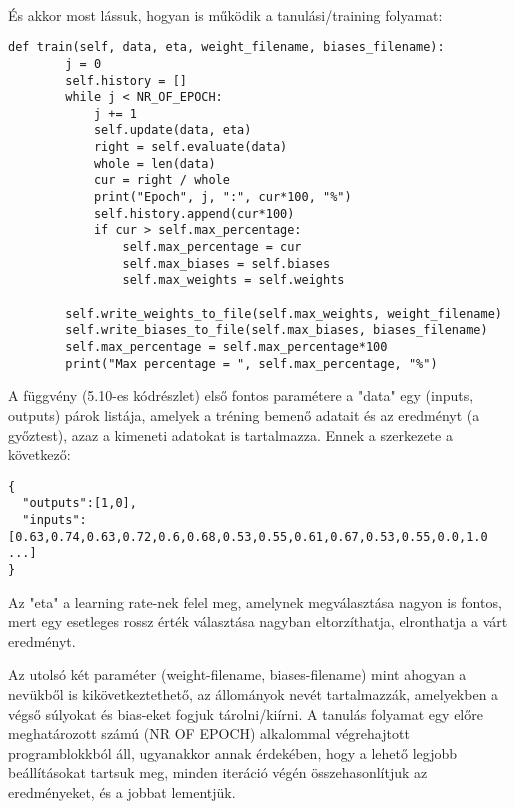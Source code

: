 \paragraph{}
És akkor most lássuk, hogyan is működik a tanulási/training folyamat:
\begin{lstlisting}[caption= A train függvény]
def train(self, data, eta, weight_filename, biases_filename):
        j = 0
        self.history = []
        while j < NR_OF_EPOCH:
            j += 1
            self.update(data, eta)
            right = self.evaluate(data)
            whole = len(data)
            cur = right / whole
            print("Epoch", j, ":", cur*100, "%")
            self.history.append(cur*100)
            if cur > self.max_percentage:
                self.max_percentage = cur
                self.max_biases = self.biases
                self.max_weights = self.weights

        self.write_weights_to_file(self.max_weights, weight_filename)    
        self.write_biases_to_file(self.max_biases, biases_filename)
        self.max_percentage = self.max_percentage*100
        print("Max percentage = ", self.max_percentage, "%")
\end{lstlisting}

A függvény (5.10-es kódrészlet) első fontos paramétere a "data" egy (inputs, outputs) párok listája, amelyek a tréning bemenő adatait és az eredményt (a győztest), azaz a kimeneti adatokat is tartalmazza. Ennek a szerkezete a következő:

\begin{lstlisting}[caption= A data-paraméter egy eleme]
{
  "outputs":[1,0],
  "inputs":[0.63,0.74,0.63,0.72,0.6,0.68,0.53,0.55,0.61,0.67,0.53,0.55,0.0,1.0 ...]
}
\end{lstlisting}

Az "eta" a learning rate-nek felel meg, amelynek megválasztása nagyon is fontos, mert egy esetleges rossz érték választása nagyban eltorzíthatja, elronthatja a várt eredményt.
 
Az utolsó két paraméter (weight-filename, biases-filename) mint ahogyan a nevükből is kikövetkeztethető, az állományok nevét tartalmazzák, amelyekben a végső súlyokat és bias-eket fogjuk tárolni/kiírni. A tanulás folyamat egy előre meghatározott számú (NR OF EPOCH) alkalommal végrehajtott programblokkból áll, ugyanakkor annak érdekében, hogy a lehető legjobb beállításokat tartsuk meg, minden iteráció végén összehasonlítjuk az eredményeket, és a jobbat lementjük.
